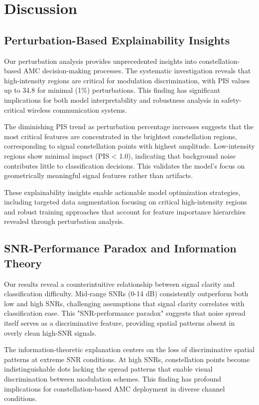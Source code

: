 \documentclass{ELSP}
\begin{document}
\section{Discussion}

\subsection{Perturbation-Based Explainability Insights}

Our perturbation analysis provides unprecedented insights into constellation-based AMC decision-making processes. The systematic investigation reveals that high-intensity regions are critical for modulation discrimination, with PIS values up to 34.8 for minimal (1\%) perturbations. This finding has significant implications for both model interpretability and robustness analysis in safety-critical wireless communication systems.

The diminishing PIS trend as perturbation percentage increases suggests that the most critical features are concentrated in the brightest constellation regions, corresponding to signal constellation points with highest amplitude. Low-intensity regions show minimal impact (PIS < 1.0), indicating that background noise contributes little to classification decisions. This validates the model's focus on geometrically meaningful signal features rather than artifacts.

These explainability insights enable actionable model optimization strategies, including targeted data augmentation focusing on critical high-intensity regions and robust training approaches that account for feature importance hierarchies revealed through perturbation analysis.

\subsection{SNR-Performance Paradox and Information Theory}

Our results reveal a counterintuitive relationship between signal clarity and classification difficulty. Mid-range SNRs (0-14 dB) consistently outperform both low and high SNRs, challenging assumptions that signal clarity correlates with classification ease. This "SNR-performance paradox" suggests that noise spread itself serves as a discriminative feature, providing spatial patterns absent in overly clean high-SNR signals.

The information-theoretic explanation centers on the loss of discriminative spatial patterns at extreme SNR conditions. At high SNRs, constellation points become indistinguishable dots lacking the spread patterns that enable visual discrimination between modulation schemes. This finding has profound implications for constellation-based AMC deployment in diverse channel conditions.
\end{document}
